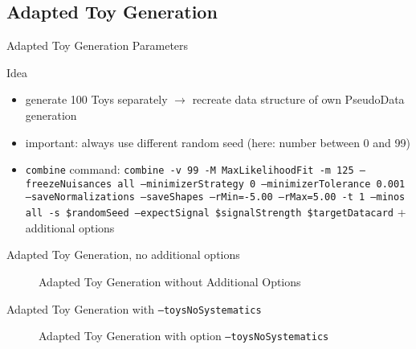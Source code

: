 \subsection{Adapted Toy Generation}
\begin{frame}{Adapted Toy Generation Parameters}
\begin{block}{Idea}
\begin{itemize}
\item generate 100 Toys separately $\rightarrow$ recreate data structure of own PseudoData generation
\item important: always use different random seed (here: number between 0 and 99)
\item \texttt{combine} command: \texttt{combine -v 99 -M MaxLikelihoodFit -m 125 --freezeNuisances all --minimizerStrategy 0 --minimizerTolerance 0.001 --saveNormalizations --saveShapes --rMin=-5.00 --rMax=5.00 -t 1 --minos all -s \$randomSeed --expectSignal \$signalStrength \$targetDatacard} + additional options
\end{itemize}
\end{block}
\end{frame}

\begin{frame}{Adapted Toy Generation, no additional options}
\begin{figure}
\centering
{}
\caption[Adapted Toy Generation without Additional Options]{Adapted Toy Generation without Additional Options}
\end{figure}
\end{frame}

\begin{frame}{Adapted Toy Generation with \texttt{--toysNoSystematics}}
\begin{figure}
\centering
{}
\caption[Adapted Toy Generation with option \texttt{--toysNoSystematics}]{Adapted Toy Generation with option \texttt{--toysNoSystematics}}
\end{figure}
\end{frame}


